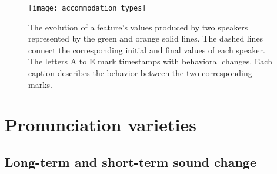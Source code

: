 \begin{figure}[t]
	\centering
	\texttt{[image: accommodation\_types]}
	\caption[Different accommodation types in a conversation]
		{The evolution of a feature's values produced by two speakers represented by the green and orange solid lines.
		The dashed lines connect the corresponding initial and final values of each speaker.
		The letters A to E mark timestamps with behavioral changes.
		Each caption describes the behavior between the two corresponding marks.}
	\label{fig:accommodation_types}
\end{figure}

\section{Pronunciation varieties}
\label{sec:pronunciation_varieties}


\subsection{Long-term and short-term sound change}
\label{subsec:sound_change}


\citet{Ohala1989sound}\\
\citet{Ohala1990phonetics}\\
\citet{Ohala1993phonetics}\\ %


